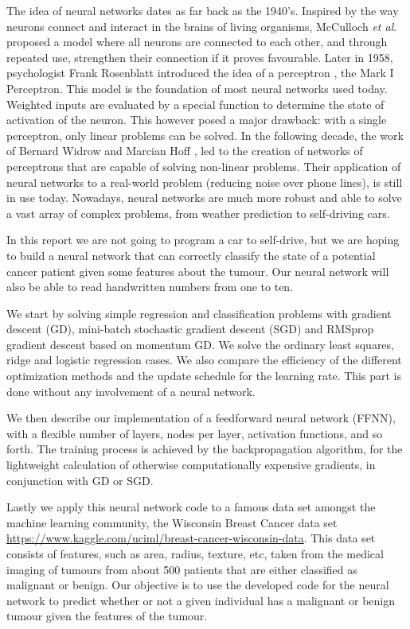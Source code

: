 \documentclass[aps,reprint,superscriptaddress,nofootinbib]{revtex4-2}
\begin{document}
    The idea of neural networks dates as far back as the 1940's. Inspired by the way neurons connect and interact in the brains of living organisms, McCulloch \textit{et al}. \cite{fitch1944mcculloch} proposed a model where all neurons are connected to each other, and through repeated use, strengthen their connection if it proves favourable. Later in 1958, psychologist Frank Rosenblatt introduced the idea of a perceptron \cite{rosenblatt1958perceptron}, the Mark I Perceptron. This model is the foundation of most neural networks used today. Weighted inputs are evaluated by a special function to determine the state of activation of the neuron. This however posed a major drawback: with a single perceptron, only linear problems can be solved. In the following decade, the work of Bernard Widrow and Marcian Hoff \cite{widrow1960adaptive}, led to the creation of networks of perceptrons that are capable of solving non-linear problems. Their application of neural networks to a real-world problem (reducing noise over phone lines), is still in use today. Nowadays, neural networks are much more robust and able to solve a vast array of complex problems, from weather prediction to self-driving cars.
    
    In this report we are not going to program a car to self-drive, but we are hoping to build a neural network that can correctly classify the state of a potential cancer patient given some features about the tumour. Our neural network will also be able to read handwritten numbers from one to ten. 
    
    We start by solving simple regression and classification problems with gradient descent (GD), mini-batch stochastic gradient descent (SGD) and RMSprop gradient descent based on momentum GD. We solve the ordinary least squares, ridge and logistic regression cases. We also compare the efficiency of the different optimization methods and the update schedule for the learning rate. This part is done without any involvement of a neural network.
    
    We then describe our implementation of a feedforward neural network (FFNN), with a flexible number of layers, nodes per layer, activation functions, and so forth. The training process is achieved by the backpropagation algorithm, for the lightweight calculation of otherwise computationally expensive gradients, in conjunction with GD or SGD.
    
    Lastly we apply this neural network code to a famous data set amongst the machine learning community, the Wisconsin Breast Cancer data set \url{https://www.kaggle.com/uciml/breast-cancer-wisconsin-data}. This data set consists of features, such as area, radius, texture, etc, taken from the medical imaging of tumours from about 500 patients that are either classified as malignant or benign. Our objective is to use the developed code for the neural network to predict whether or not a given individual has a malignant or benign tumour given the features of the tumour.
    
\end{document}
